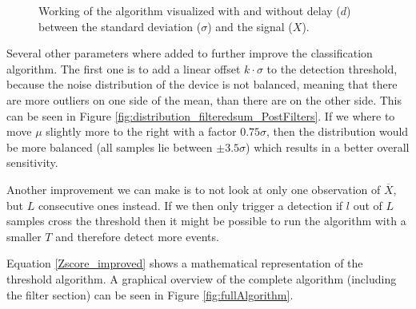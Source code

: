 \begin{figure}
	\centering     %
	\caption{Working of the algorithm visualized with and without delay ($d$) between the standard deviation ($\sigma$) and the signal ($X$).\label{fig:InfluenceOfD}}
\end{figure}

Several other parameters where added to further improve the classification algorithm. The first one is to add a linear offset $k\cdot\sigma$ to the detection threshold, because the noise distribution of the device is not balanced, meaning that there are more outliers on one side of the mean, than there are on the other side. This can be seen in Figure \ref{fig:distribution_filteredsum_PostFilters}. If we where to move $\mu$ slightly more to the right with a factor $0.75 \sigma$, then the distribution would be more balanced (all samples lie between $\pm 3.5\sigma$) which results in a better overall sensitivity.

Another improvement we can make is to not look at only one observation of $\overline{X}$, but $L$ consecutive ones instead. If we then only trigger a detection if $l$ out of $L$ samples cross the threshold then it might be possible to run the algorithm with a smaller $T$ and therefore detect more events. 

Equation \ref{Zscore_improved} shows a mathematical representation of the threshold algorithm. A graphical overview of the complete algorithm (including the filter section) can be seen in Figure \ref{fig:fullAlgorithm}.

